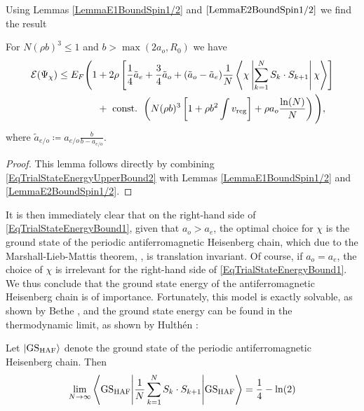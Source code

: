 Using Lemmas \ref{LemmaE1BoundSpin1/2} and $ \ref{LemmaE2BoundSpin1/2} $ we find the result 
\begin{lemma}\label{LemmaTrialStateEnergySpin1/2}
	For $ N(\rho b)^3\leq  1 $ and $ b>\max(2 a_o,R_0) $ we have \begin{equation}\label{EqTrialStateEnergyBound1}
	\begin{aligned}
	\mathcal{E}(\Psi_{\chi})\leq E_F\Bigg( 1&+2\rho\left[\frac{1}{4}\tilde{a}_e+\frac{3}{4}\tilde{a}_o+(\tilde{a}_o-\tilde{a}_e)\frac{1}{N}\left\langle\chi \left\vert \sum_{k=1}^N S_k\cdot S_{k+1}\right\vert \chi\right\rangle\right]\\ &+\textnormal{ const. }\left( N (\rho b)^3\left[1+\rho b^2\int v_{\textnormal{reg}}\right]+\rho a_o \frac{\ln(N)}{N}\right) \Bigg),
	\end{aligned}
	\end{equation}
	where $ \tilde{a}_{e/o}\coloneqq a_{e/o}\frac{b}{b-a_{e/o}} $.
\end{lemma}
\begin{proof}
	This lemma follows directly by combining \eqref{EqTrialStateEnergyUpperBound2} with Lemmas \ref{LemmaE1BoundSpin1/2} and \ref{LemmaE2BoundSpin1/2}.
\end{proof}
It is then immediately clear that on the right-hand side of \eqref{EqTrialStateEnergyBound1}, given that $ a_o>a_e $, the optimal choice for $ \chi $ is the ground state of the periodic antiferromagnetic Heisenberg chain, which due to the Marshall-Lieb-Mattis theorem, \cite{lieb1962ordering,marshall1955antiferromagnetism}, is translation invariant. Of course, if $ a_o=a_e $, the choice of $ \chi $ is irrelevant for the right-hand side of \eqref{EqTrialStateEnergyBound1}. \\
We thus conclude that the ground state energy of the antiferromagnetic Heisenberg chain is of importance. Fortunately, this model is exactly solvable, as shown by Bethe \cite{bethe1931theorie}, and the ground state energy can be found in the thermodynamic limit, as shown by Hulthén \cite{hult1938}: \begin{lemma}\label{LemmaHeisenbergChainThermodynamicGSEnergy}
Let $ \ket{\textnormal{GS}_{\textnormal{HAF}}} $ denote the ground state of the periodic antiferromagnetic Heisenberg chain. Then\begin{equation}
\lim\limits_{N\to\infty}\left\langle\textnormal{GS}_{\textnormal{HAF}}\Bigg\vert\frac{1}{N}\sum_{k=1}^N S_k\cdot S_{k+1} \Bigg\vert \textnormal{GS}_{\textnormal{HAF}}\right\rangle=\frac{1}{4}-\ln(2) 
\end{equation}
\end{lemma}
